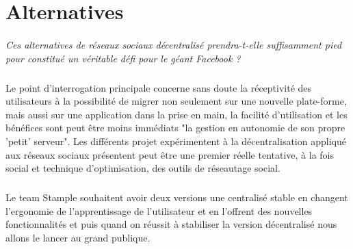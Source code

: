 \section{Alternatives}
\paragraph{}
\textit{Ces alternatives de réseaux sociaux décentralisé prendra-t-elle suffisamment pied pour constitué un véritable défi pour le géant Facebook ?}
\subparagraph{}
Le point d'interrogation principale concerne sans doute la réceptivité des utilisateurs à la possibilité de migrer non seulement sur une nouvelle plate-forme, mais aussi sur une application dans la prise en main, la facilité d'utilisation et les bénéfices sont peut être moins immédiats "la gestion en autonomie de son propre 'petit' serveur".
Les différents projet expérimentent à la décentralisation appliqué aux réseaux sociaux présentent peut être une premier réelle tentative, à la fois social et technique d'optimisation, des outils de réseautage social.
\subparagraph{}
Le team Stample souhaitent avoir deux versions une centralisé stable en changent l'ergonomie de l'apprentissage de l'utilisateur et en l'offrent des nouvelles fonctionnalités et puis quand on réussit à stabiliser la version décentralisé nous allons le lancer au grand publique.  

